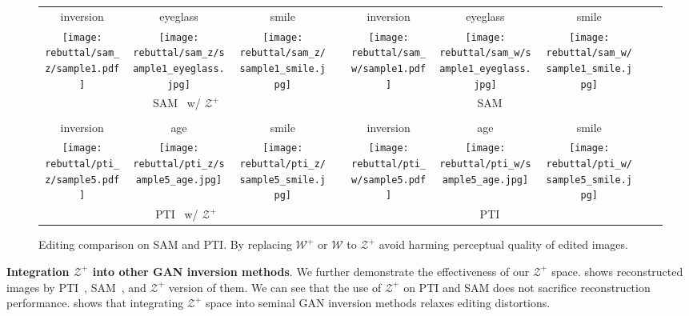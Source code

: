\documentclass[10pt,twocolumn,letterpaper]{article}
\newcommand{\WS}{\mathcal{W}}
\newcommand{\WPS}{\mathcal{W}^{+}}
\newcommand{\ZPS}{\mathcal{Z}^{+}}
\begin{document}
\begin{figure}[t]
  \centering
    \bgroup 
    \def\arraystretch{0.2} 
    \setlength\tabcolsep{1pt}
    \begin{tabular}{ccccccccc}
\footnotesize inversion & \footnotesize  eyeglass & \footnotesize  smile & \footnotesize \phantom{0} & \footnotesize  inversion & \footnotesize  eyeglass & \footnotesize  smile \\
\texttt{[image: rebuttal/sam\_z/sample1.pdf]} &
\texttt{[image: rebuttal/sam\_z/sample1\_eyeglass.jpg]} &
\texttt{[image: rebuttal/sam\_z/sample1\_smile.jpg]} &&
\texttt{[image: rebuttal/sam\_w/sample1.pdf]} &
\texttt{[image: rebuttal/sam\_w/sample1\_eyeglass.jpg]} &
\texttt{[image: rebuttal/sam\_w/sample1\_smile.jpg]} \\
\multicolumn{3}{c}{SAM~\cite{parmar2022spatially} w/ $\ZPS$} && \multicolumn{3}{c}{SAM~\cite{parmar2022spatially}} \\\\
\footnotesize inversion &\footnotesize age &\footnotesize smile &&\footnotesize inversion &\footnotesize age &\footnotesize smile \\
\texttt{[image: rebuttal/pti\_z/sample5.pdf]} &
\texttt{[image: rebuttal/pti\_z/sample5\_age.jpg]} &
\texttt{[image: rebuttal/pti\_z/sample5\_smile.jpg]} &&
\texttt{[image: rebuttal/pti\_w/sample5.pdf]} &
\texttt{[image: rebuttal/pti\_w/sample5\_age.jpg]} &
\texttt{[image: rebuttal/pti\_w/sample5\_smile.jpg]} \\
\multicolumn{3}{c}{PTI~\cite{roich2021pivotal} w/ $\ZPS$} && \multicolumn{3}{c}{PTI~\cite{roich2021pivotal}}
    \end{tabular}\egroup
\vspace{-0.8em}
\caption{Editing comparison on SAM and PTI. By replacing $\WPS$ or $\WS$ to $\ZPS$ avoid harming perceptual quality of edited images.\vspace{-2em}}\label{fig:editing_sota}
\end{figure}

\noindent 
\textbf{Integration $\ZPS$ into other GAN inversion methods}.
We further demonstrate the effectiveness of our $\ZPS$ space.  shows reconstructed images by PTI~\cite{roich2021pivotal}, SAM~\cite{parmar2022spatially}, and $\ZPS$ version of them. We can see that the use of $\ZPS$ on PTI and SAM does not sacrifice reconstruction performance.
 shows that integrating $\ZPS$ space into seminal GAN inversion methods relaxes editing distortions.
\end{document}
